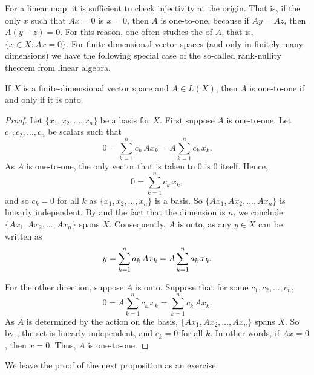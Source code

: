 For a linear map, it is sufficient to check injectivity at the origin.
That is, if the only $x$ such that $Ax =0$ is $x=0$, then $A$ is one-to-one,
because if $Ay=Az$, then $A(y-z) = 0$.  For this reason, 
one often studies the \emph{} of $A$, that is,
$\{ x \in X : Ax = 0 \}$.
For finite-dimensional vector spaces (and only in finitely many dimensions)
we have the following special case of the
so-called rank-nullity theorem from linear algebra.

\begin{prop} \label{mv:prop:lin11onto}
If $X$ is a finite-dimensional vector space and $A \in L(X)$, then $A$ is one-to-one if and only if it is onto.
\end{prop}

\begin{proof}
Let $\{ x_1,x_2,\ldots,x_n \}$ be a basis for $X$.
First suppose $A$ is one-to-one.  Let $c_1,c_2,\ldots,c_n$ be scalars such that
\begin{equation*}
0 =
\sum_{k=1}^n c_k \, Ax_k =
A\sum_{k=1}^n c_k \, x_k 
.
\end{equation*}
As $A$ is one-to-one,
the only vector that is taken to 0 is 0 itself.  
Hence,
\begin{equation*}
0 =
\sum_{k=1}^n c_k \, x_k,
\end{equation*}
and so $c_k = 0$ for all $k$ as $\{ x_1,x_2,\ldots,x_n \}$ is a basis.
So $\{ Ax_1, Ax_2, \ldots, Ax_n \}$ is linearly independent.
By 
and the fact that the dimension is $n$, we conclude
$\{ Ax_1, Ax_2, \ldots, Ax_n \}$ spans $X$.  Consequently, $A$ is onto,
as any $y \in X$ can be written as
\begin{equation*}
y = \sum_{k=1}^n a_k \, Ax_k =
A\sum_{k=1}^n a_k \, x_k .
\avoidbreak
\end{equation*}

For the other direction, suppose $A$ is onto.
Suppose that for some
$c_1,c_2,\ldots,c_n$,
\begin{equation*}
0 = A\sum_{k=1}^n c_k \, x_k =
\sum_{k=1}^n c_k \, Ax_k .
\end{equation*}
As $A$ is determined by the action on the basis,
$\{ Ax_1, Ax_2, \ldots, Ax_n \}$ spans $X$.
So by , the set is linearly independent,
and $c_k = 0$ for all $k$.  In other words, if $Ax = 0$, then $x=0$.
Thus, $A$ is one-to-one.
\end{proof}

We leave the proof of the next proposition as an exercise.

